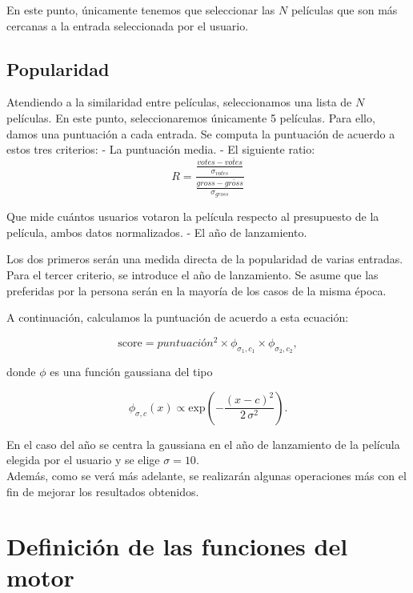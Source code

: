 En este punto, únicamente tenemos que seleccionar las $N$ películas que son más cercanas a la entrada seleccionada por el usuario.

\subsection{Popularidad}

Atendiendo a la similaridad entre películas, seleccionamos una lista de $N$ películas. En este punto, seleccionaremos únicamente 5 películas. Para ello, damos una puntuación a cada entrada. Se computa la puntuación de acuerdo a estos tres criterios:
- La puntuación media.
- El siguiente ratio:
\begin{equation}
    R = \frac{\frac{votes - \bar{votes}}{\sigma_{votes}}}{\frac{gross - \bar{gross}}{\sigma_{gross}}}
\end{equation}

Que mide cuántos usuarios votaron la película respecto al presupuesto de la película, ambos datos normalizados.
- El año de lanzamiento.

Los dos primeros serán una medida directa de la popularidad de varias entradas. Para el tercer criterio, se introduce el año de lanzamiento. Se asume que las preferidas por la persona serán en la mayoría de los casos de la misma época.

A continuación, calculamos la puntuación de acuerdo a esta ecuación:

\begin{equation}
\mathrm{score} = puntuación^2 \times \phi_{\sigma_1, c_1} \times  \phi_{\sigma_2, c_2},
\label{eq:criteria}
\end{equation}

donde $\phi$ es una función gaussiana del tipo

\begin{equation}
\phi_{\sigma, c}(x) \propto \mathrm{exp}\left(-\frac{(x-c)^2}{2 \, \sigma^2}\right).
\end{equation}

En el caso del año se centra la gaussiana en el año de lanzamiento de la película elegida por el usuario y se elige $\sigma = 10$.\\

Además, como se verá más adelante, se realizarán algunas operaciones más con el fin de mejorar los resultados obtenidos.

\section{Definición de las funciones del motor}

